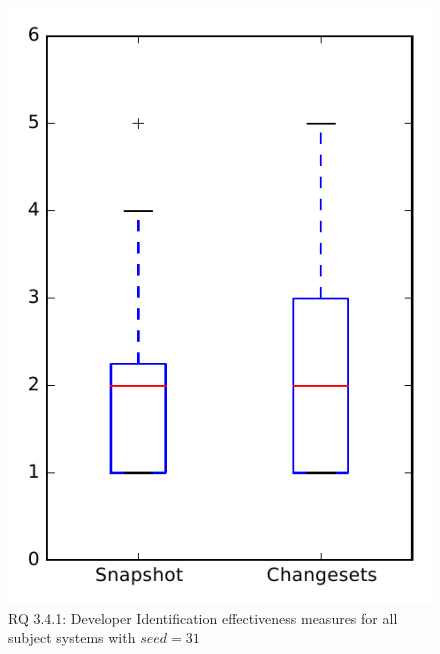
\begin{figure}
\centering
\includegraphics[height=0.4\textheight]{figures/dit_seed/rq1_overview_31}
\caption{RQ 3.4.1: Developer Identification effectiveness measures for all subject systems with $seed=31$}
\label{fig:dit_seed:rq1:overview}
\end{figure}

